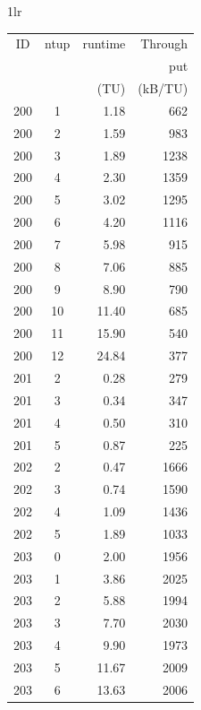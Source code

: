 \documentclass[
  digital,     %
  oneside,     %
  nosansbold,  %
  nocolorbold, %
  nolof,         %
  nolot,         %
]{fithesis4}
\begin{document}
\begin{table}[H]
  \begin{tabularx}{1\textwidth}{lr}
    {\begin{tabularx}{0.5\textwidth}{c|c|r|r}
        ID & ntup & runtime & Through\\
         & & & put \\
         & & (TU) & (kB/TU) \\
        \midrule
        200 & 1 & 1.18 & 662 \\
        200 & 2 & 1.59 & 983 \\
        200 & 3 & 1.89 & 1238 \\
        200 & 4 & 2.30 & 1359 \\
        200 & 5 & 3.02 & 1295 \\
        200 & 6 & 4.20 & 1116 \\
        200 & 7 & 5.98 & 915 \\
        200 & 8 & 7.06 & 885 \\
        200 & 9 & 8.90 & 790 \\
        200 & 10 & 11.40 & 685 \\
        200 & 11 & 15.90 & 540 \\
        200 & 12 & 24.84 & 377 \\
        201 & 2 & 0.28 & 279 \\
        201 & 3 & 0.34 & 347 \\
        201 & 4 & 0.50 & 310 \\
        201 & 5 & 0.87 & 225 \\
        202 & 2 & 0.47 & 1666 \\
        202 & 3 & 0.74 & 1590 \\
        202 & 4 & 1.09 & 1436 \\
        202 & 5 & 1.89 & 1033 \\
        203 & 0 & 2.00 & 1956 \\
        203 & 1 & 3.86 & 2025 \\
        203 & 2 & 5.88 & 1994 \\
        203 & 3 & 7.70 & 2030 \\
        203 & 4 & 9.90 & 1973 \\
        203 & 5 & 11.67 & 2009 \\
        203 & 6 & 13.63 & 2006 \\
    \end{tabularx}} 


\end{tabularx}
\end{table}
\end{document}
